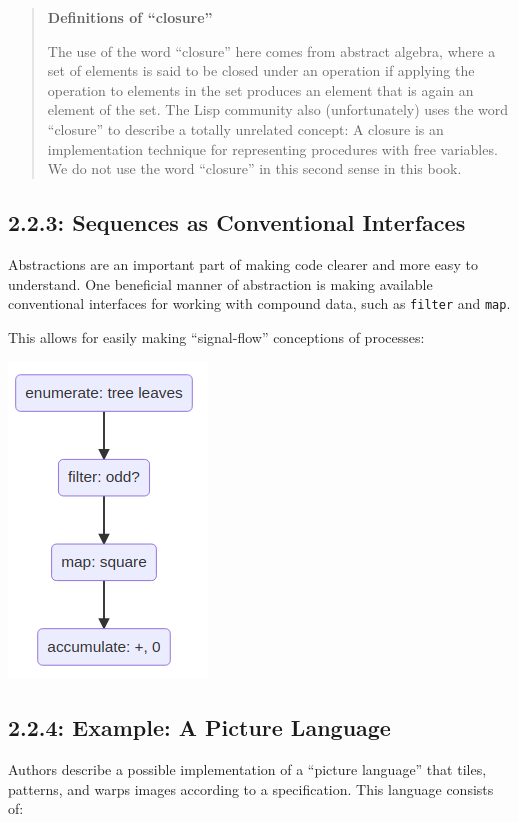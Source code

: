 \documentclass[final,fleqn,titlepage]{article}
\begin{document}
\begin{quote}
\textbf{Definitions of ``closure''}

The use of the word ``closure'' here comes from abstract algebra, where a set of
elements is said to be closed under an operation if applying the operation to
elements in the set produces an element that is again an element of the set.
The Lisp community also (unfortunately) uses the word ``closure'' to describe a
totally unrelated concept: A closure is an implementation technique for
representing procedures with free variables. We do not use the word ``closure''
in this second sense in this book.
\end{quote}

\subsection{2.2.3: Sequences as Conventional Interfaces}
\label{sec:org070c647}
Abstractions are an important part of making code clearer and more easy to
understand. One beneficial manner of abstraction is making available
conventional interfaces for working with compound data, such as \texttt{filter} and
\texttt{map}.

This allows for easily making ``signal-flow'' conceptions of processes:

\begin{center}
\includegraphics[width=0.3\linewidth]{2/fig/t_2-2-3.png}
\end{center}

\subsection{2.2.4: Example: A Picture Language}
\label{sec:org1bed1ff}
Authors describe a possible implementation of a ``picture language'' that tiles,
patterns, and warps images according to a specification. This language consists
of:
\end{document}
